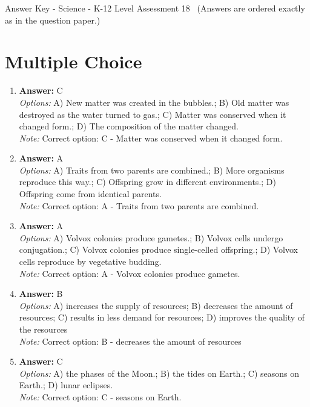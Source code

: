 \documentclass[12pt]{article}
\begin{document}
\begin{center}
Answer Key - Science - K-12 Level Assessment 18 \
\small (Answers are ordered exactly as in the question paper.)
\end{center}

\section*{Multiple Choice}
\begin{enumerate}[label=\arabic*.]
\item \textbf{Answer:} C
\\ \textit{Options:} A) New matter was created in the bubbles.; B) Old matter was destroyed as the water turned to gas.; C) Matter was conserved when it changed form.; D) The composition of the matter changed.
\\ \textit{Note:} Correct option: C - Matter was conserved when it changed form.
\item \textbf{Answer:} A
\\ \textit{Options:} A) Traits from two parents are combined.; B) More organisms reproduce this way.; C) Offspring grow in different environments.; D) Offspring come from identical parents.
\\ \textit{Note:} Correct option: A - Traits from two parents are combined.
\item \textbf{Answer:} A
\\ \textit{Options:} A) Volvox colonies produce gametes.; B) Volvox cells undergo conjugation.; C) Volvox colonies produce single-celled offspring.; D) Volvox cells reproduce by vegetative budding.
\\ \textit{Note:} Correct option: A - Volvox colonies produce gametes.
\item \textbf{Answer:} B
\\ \textit{Options:} A) increases the supply of resources; B) decreases the amount of resources; C) results in less demand for resources; D) improves the quality of the resources
\\ \textit{Note:} Correct option: B - decreases the amount of resources
\item \textbf{Answer:} C
\\ \textit{Options:} A) the phases of the Moon.; B) the tides on Earth.; C) seasons on Earth.; D) lunar eclipses.
\\ \textit{Note:} Correct option: C - seasons on Earth.
\end{enumerate}
\end{document}
